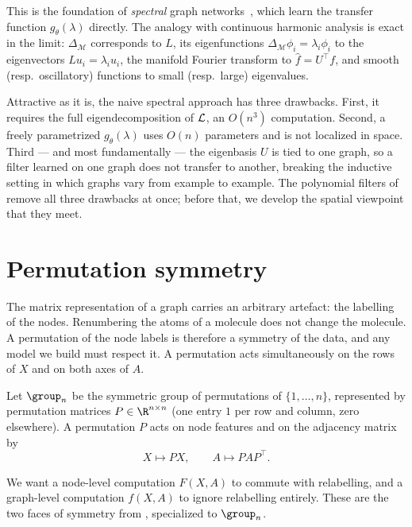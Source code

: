 This is the foundation of \emph{spectral} graph networks~\citep%
{bruna2014spectralnetworkslocallyconnected}, which learn the transfer function
$g_\theta(\lambda)$ directly. The analogy with continuous harmonic analysis is
exact in the limit: $\Delta_{\mathcal{M}}$ corresponds to $L$, its eigenfunctions
$\Delta_{\mathcal{M}}\phi_i = \lambda_i \phi_i$ to the eigenvectors
$L u_i = \lambda_i u_i$, the manifold Fourier transform to $\hat f = U^\top f$,
and smooth (resp.\ oscillatory) functions to small (resp.\ large) eigenvalues.

Attractive as it is, the naive spectral approach has three drawbacks. First, it
requires the full eigendecomposition of $\mathcal{L}$, an $O(n^3)$ computation. Second,
a freely parametrized $g_\theta(\lambda)$ uses $O(n)$ parameters and is not
localized in space. Third --- and most fundamentally --- the eigenbasis $U$ is
tied to one graph, so a filter learned on one graph does not transfer to another,
breaking the inductive setting in which graphs vary from example to example. The
polynomial filters of  remove all three drawbacks at once;
before that, we develop the spatial viewpoint that they meet.

\section{Permutation symmetry}
\label{sec:graphs:permutation}

The matrix representation of a graph carries an arbitrary artefact: the labelling
of the nodes. Renumbering the atoms of a molecule does not change the molecule. A
permutation of the node labels is therefore a symmetry of the data, and any model
we build must respect it. A permutation acts simultaneously on the rows of $X$
and on both axes of $A$.

\begin{definition}
\label{def:graphs:permutation-action}
Let $\group_n$ be the symmetric group of permutations of $\{1, \dots, n\}$,
represented by permutation matrices $P \in \R^{n \times n}$ (one entry $1$ per
row and column, zero elsewhere). A permutation $P$ acts on node features and on
the adjacency matrix by
\[
  X \mapsto P X, \qquad A \mapsto P A P^\top .
\]
\end{definition}

We want a node-level computation $F(X, A)$ to commute with relabelling, and a
graph-level computation $f(X, A)$ to ignore relabelling entirely. These are the
two faces of symmetry from , specialized to $\group_n$.

